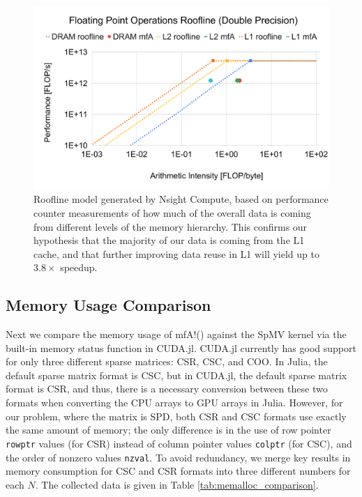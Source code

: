 \begin{figure}
    \centering
    \includegraphics[width=\linewidth]{figures/Floating_Point_Operations_Roofline_Double_Precision.pdf}
    \caption{
    Roofline model generated by Nsight Compute, based on performance counter measurements of how much of the overall data is coming from different levels of the memory hierarchy.
    This confirms our hypothesis that the majority of our data is coming from the L1 cache, and that further improving data reuse in L1 will yield up to $3.8\times$ speedup.
    }
    \label{fig:roofline-double-precision}
\end{figure}




\subsection{Memory Usage Comparison}
Next we compare the memory usage of {\ttfamily mfA!}() against the SpMV kernel via the built-in memory status function in CUDA.jl. 
CUDA.jl currently has good support for only three different sparse matrices: CSR, CSC, and COO.
In Julia, the default sparse matrix format is CSC, but in CUDA.jl, the default sparse matrix format is CSR, and thus, there is a necessary conversion between these two formats when converting the CPU arrays to GPU arrays in Julia. 
However, for our problem, where the matrix is SPD, both CSR and CSC formats use exactly the same amount of memory; the only difference is in the use of row pointer \texttt{rowptr} values (for CSR) instead of column pointer values \texttt{colptr} (for CSC), and the order of nonzero values \texttt{nzval}. 
To avoid redundancy, we merge key results in memory consumption for CSC and CSR formats into three different numbers for each $N$.
The collected data is given in Table \ref{tab:memalloc_comparison}. 
\label{sec:mem_comp}


